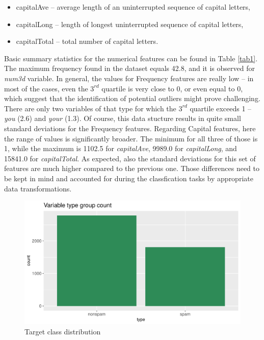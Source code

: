 \documentclass{article}\usepackage[]{graphicx}\usepackage[]{xcolor}
\makeatletter
\def\maxwidth{ %
  \ifdim\Gin@nat@width>\linewidth
    \linewidth
  \else
    \Gin@nat@width
  \fi
}
\newenvironment{knitrout}{}{} %
\makeatother
\begin{document}
\begin{itemize}
  \item capitalAve -- average length of an uninterrupted sequence of capital letters,
  \item capitalLong -- length of longest uninterrupted sequence of capital letters,
  \item capitalTotal -- total number of capital letters.
\end{itemize}
Basic summary statistics for the numerical features can be found in Table \ref{tab1}.
The maximum frequency found in the dataset equals 42.8, and it is observed for \textit{num3d} variable. 
In general, the values for Frequency features are really low -- in most of the cases, even the $3^{rd}$
quartile is very close to 0, or even equal to 0, which suggest that the identification of 
potential outliers might prove challenging. There are only two variables of that type
for which the $3^{rd}$ quartile exceeds 1 -- \textit{you} (2.6) and \textit{your} (1.3).
Of course, this data stucture results in quite small standard deviations for the Frequency features.
Regarding Capital features, here the range of values is significantly broader. The minimum for all
three of those is 1, while the maximum is 1102.5 for \textit{capitalAve}, 9989.0 for \textit{capitalLong},
and 15841.0 for \textit{capitalTotal}. As expected, also the standard deviations for this set
of features are much higher compared to the previous one. Those differences need to be
kept in mind and accounted for during the classfication tasks by appropriate data transformations.



\begin{knitrout}
\color{fgcolor}\begin{figure}[h]
\includegraphics[width=\maxwidth]{figure/tgtClassPlot-1} \caption[\label{fig1} Target class distribution]{\label{fig1} Target class distribution}\label{fig:tgtClassPlot}
\end{figure}

\end{knitrout}
\end{document}

